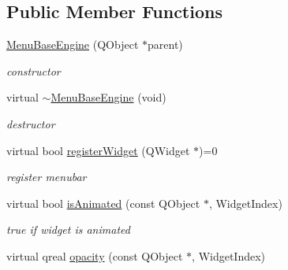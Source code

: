 \subsection*{Public Member Functions}
\begin{DoxyCompactItemize}
\item 
\mbox{\label{class_menu_base_engine_a4cac6a1c0ea78da869e403a7baaf0fd4}} 
\hyperlink{class_menu_base_engine_a4cac6a1c0ea78da869e403a7baaf0fd4}{Menu\+Base\+Engine} (Q\+Object $\ast$parent)
\begin{DoxyCompactList}\small\item\em constructor \end{DoxyCompactList}\item 
\mbox{\label{class_menu_base_engine_a498183a4f375fa8ef74e0882c4b1bcbc}} 
virtual \hyperlink{class_menu_base_engine_a498183a4f375fa8ef74e0882c4b1bcbc}{$\sim$\+Menu\+Base\+Engine} (void)
\begin{DoxyCompactList}\small\item\em destructor \end{DoxyCompactList}\item 
\mbox{\label{class_menu_base_engine_aaaf0d4c6d3658a2abe889160a5996466}} 
virtual bool \hyperlink{class_menu_base_engine_aaaf0d4c6d3658a2abe889160a5996466}{register\+Widget} (Q\+Widget $\ast$)=0
\begin{DoxyCompactList}\small\item\em register menubar \end{DoxyCompactList}\item 
\mbox{\label{class_menu_base_engine_ad5adf80cbce4da8e93783d1e9ec3f80a}} 
virtual bool \hyperlink{class_menu_base_engine_ad5adf80cbce4da8e93783d1e9ec3f80a}{is\+Animated} (const Q\+Object $\ast$, Widget\+Index)
\begin{DoxyCompactList}\small\item\em true if widget is animated \end{DoxyCompactList}\item 
\mbox{\label{class_menu_base_engine_a006ba0af63ed94ce31b188106d813583}} 
virtual qreal \hyperlink{class_menu_base_engine_a006ba0af63ed94ce31b188106d813583}{opacity} (const Q\+Object $\ast$, Widget\+Index)

\end{DoxyCompactItemize}
